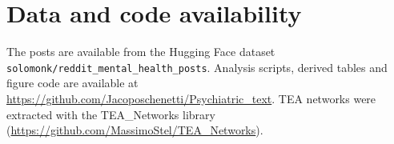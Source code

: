 \documentclass[11pt,a4paper]{article}
\begin{document}
\section*{Data and code availability}

The posts are available from the Hugging Face dataset \texttt{solomonk/reddit\_mental\_health\_posts}. Analysis scripts, derived tables and figure code are available at \url{https://github.com/Jacoposchenetti/Psychiatric_text}. TEA networks were extracted with the TEA\_Networks library (\url{https://github.com/MassimoStel/TEA_Networks}).


\end{document}
